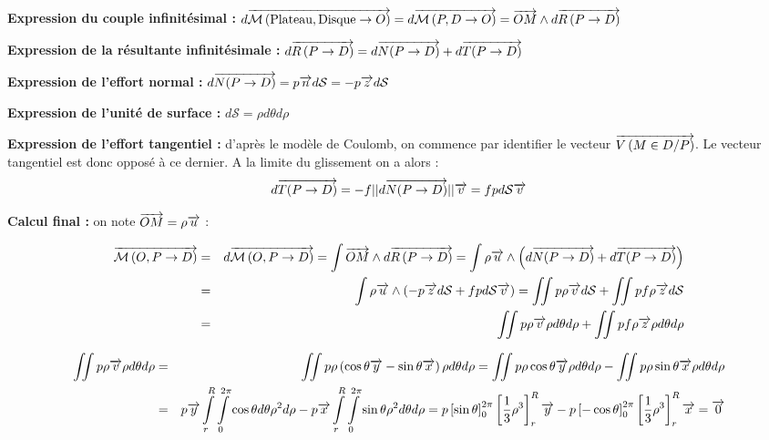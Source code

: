 \documentclass[10pt]{article}
\begin{document}
\textbf{Expression du couple infinitésimal : }$
d\overrightarrow{\mathcal{M}\left( {\text{Plateau}}, {\text{Disque}} \rightarrow {O}\right)} =
d\overrightarrow{\mathcal{M}\left( {P}, {D} \rightarrow {O}\right)} =  \overrightarrow{OM}\wedge d\overrightarrow{R\left( {P} \rightarrow {D}\right)}
$

\textbf{Expression de la résultante infinitésimale : } 
$d\overrightarrow{R\left( {P} \rightarrow {D}\right)} = d\overrightarrow{N(P\rightarrow D)}+d\overrightarrow{T(P\rightarrow D)}$

\textbf{Expression de l'effort normal : }
$ d\overrightarrow{N(P\rightarrow D)} = p \overrightarrow{n} d\mathcal{S} = -p \overrightarrow{z} d\mathcal{S} $

\textbf{Expression de l'unité de surface : }
$ d\mathcal{S} = \rho d\theta d\rho $

\textbf{Expression de l'effort tangentiel : } d'après le modèle de Coulomb, on commence par identifier le vecteur $\overrightarrow{V\left( {M} \in {D}/{P}\right)}$.
Le vecteur tangentiel est donc opposé à ce dernier. A la limite du glissement on a alors : 
$$
d\overrightarrow{T(P\rightarrow D)} = -f ||d\overrightarrow{N(P\rightarrow D)}|| \overrightarrow{v}    = fp d\mathcal{S}\overrightarrow{v}
$$

\textbf{Calcul final :} on note $\overrightarrow{OM}=\rho\overrightarrow{u}$ :

\begin{eqnarray*}
\overrightarrow{\mathcal{M}\left( {O}, {P} \rightarrow {D}\right)}  
&=& d\overrightarrow{\mathcal{M}\left( {O}, {P} \rightarrow {D}\right)}  =  \int \overrightarrow{OM}\wedge d\overrightarrow{R\left( {P} \rightarrow {D}\right)} = \int \rho\overrightarrow{u} \wedge \left( d\overrightarrow{N(P\rightarrow D)}+d\overrightarrow{T(P\rightarrow D)} \right)\\
&=& \int \rho\overrightarrow{u} \wedge \left( -p \overrightarrow{z} d\mathcal{S} +fp d\mathcal{S}\overrightarrow{v} \right) =  \iint p\rho\overrightarrow{v} d\mathcal{S} +\iint pf\rho  \overrightarrow{z}d\mathcal{S} \\
& =& \iint p\rho\overrightarrow{v} \rho d\theta d\rho +\iint pf\rho  \overrightarrow{z}\rho d\theta d\rho \\
\end{eqnarray*}

\begin{eqnarray*}
\iint p\rho\overrightarrow{v} \rho d\theta d\rho &=& \iint p\rho\left(\cos\theta\overrightarrow{y}-\sin\theta\overrightarrow{x} \right) \rho d\theta d\rho =\iint p\rho\cos\theta\overrightarrow{y}  \rho d\theta d\rho-\iint p\rho \sin\theta\overrightarrow{x}  \rho d\theta d\rho \\
&= &p \overrightarrow{y}  \int\limits_{r}^{R} \int\limits_{0}^{2\pi}\cos\theta d\theta \rho^2 d\rho- p\overrightarrow{x}\int\limits_{r}^{R} \int\limits_{0}^{2\pi} \sin\theta  \rho^2 d\theta d\rho = p \left[ \sin\theta\right]_{0}^{2\pi}\left[ \dfrac{1}{3}\rho^3\right]_{r}^{R}\overrightarrow{y}
 -p \left[ -\cos\theta\right]_{0}^{2\pi}\left[ \dfrac{1}{3}\rho^3\right]_{r}^{R}\overrightarrow{x} = \overrightarrow{0}
\end{eqnarray*}
\end{document}
